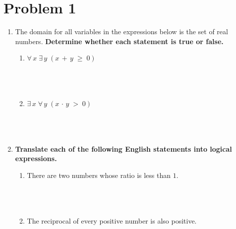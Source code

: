 \documentclass{amsart}
\theoremstyle{definition}
\theoremstyle{Exercise}
\theoremstyle{remark}
\theoremstyle{rule}
\numberwithin{equation}{section}
\begin{document}
\section*{Problem 1}
\begin{enumerate}[label=(\alph*)]
\item The domain for all variables in the expressions below is the set of real numbers. {\bf Determine whether each statement is true or false.}
\begin{enumerate}[label=(\roman*)]
  \item $\forall\, x\; \exists \,y\;(x\,+\,y\;\geq \;0)$
\\\\
\\\\
  \item $\exists \, x\; \forall \,y\;(x\,\cdot\,y\;>\; 0)$
   \\\\
\\\\
\end{enumerate}

\item {\bf Translate each of the following English statements into logical expressions.}
\begin{enumerate}[label=(\roman*)]
  \item There are two numbers whose ratio is less than $1$.
   \\\\
\\\\
  \item The reciprocal of every positive number is also positive.
   \\\\
\\\\
  \end{enumerate}
  \end{enumerate}
  \newpage
  \section*{}
  \section*{}
\end{document}
